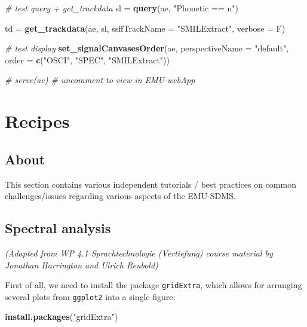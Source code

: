 \documentclass[]{book}
\newenvironment{Shaded}{\begin{snugshade}}{\end{snugshade}}
\newcommand{\CommentTok}[1]{\textcolor[rgb]{0.56,0.35,0.01}{\textit{#1}}}
\newcommand{\DataTypeTok}[1]{\textcolor[rgb]{0.13,0.29,0.53}{#1}}
\newcommand{\KeywordTok}[1]{\textcolor[rgb]{0.13,0.29,0.53}{\textbf{#1}}}
\newcommand{\NormalTok}[1]{#1}
\newcommand{\StringTok}[1]{\textcolor[rgb]{0.31,0.60,0.02}{#1}}
\begin{document}
\begin{Shaded}
\begin{Highlighting}[]
\CommentTok{# test query + get_trackdata}
\NormalTok{sl =}\StringTok{ }\KeywordTok{query}\NormalTok{(ae, }\StringTok{"Phonetic == n"}\NormalTok{)}

\NormalTok{td =}\StringTok{ }\KeywordTok{get_trackdata}\NormalTok{(ae,}
\NormalTok{                   sl,}
                   \DataTypeTok{ssffTrackName =} \StringTok{"SMILExtract"}\NormalTok{,}
                   \DataTypeTok{verbose =}\NormalTok{ F)}

\CommentTok{# test display}
\KeywordTok{set_signalCanvasesOrder}\NormalTok{(ae,}
                        \DataTypeTok{perspectiveName =} \StringTok{"default"}\NormalTok{,}
                        \DataTypeTok{order =} \KeywordTok{c}\NormalTok{(}\StringTok{"OSCI"}\NormalTok{, }\StringTok{"SPEC"}\NormalTok{, }\StringTok{"SMILExtract"}\NormalTok{))}

\CommentTok{# serve(ae) # uncomment to view in EMU-webApp}
\end{Highlighting}
\end{Shaded}

\hypertarget{part-recipes}{%
\part{Recipes}\label{part-recipes}}

\hypertarget{about}{%
\chapter{About}\label{about}}

This section contains various independent tutorials / best practices on common challenges/issues regarding various aspects of the EMU-SDMS.

\hypertarget{recipe:spectralAnalysis}{%
\chapter{Spectral analysis}\label{recipe:spectralAnalysis}}

\emph{(Adapted from WP 4.1 Sprachtechnologie (Vertiefung) course material by Jonathan Harrington and Ulrich Reubold)}

First of all, we need to install the package \texttt{gridExtra}, which allows for arranging several plots from \texttt{ggplot2} into a single figure:

\begin{Shaded}
\begin{Highlighting}[]
\KeywordTok{install.packages}\NormalTok{(}\StringTok{"gridExtra"}\NormalTok{)}
\end{Highlighting}
\end{Shaded}
\end{document}
